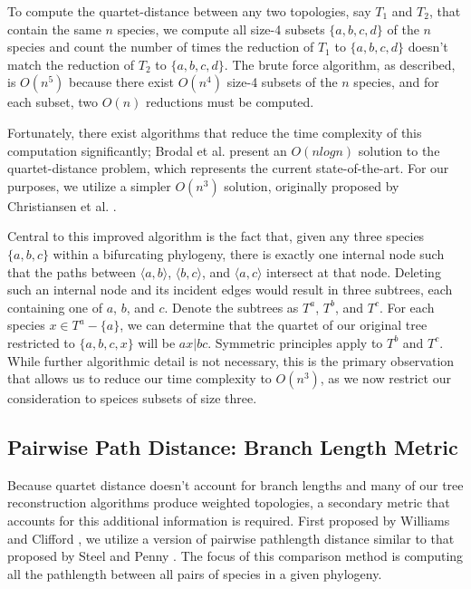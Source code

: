 \documentclass[10pt,twocolumn]{article}
\begin{document}
To compute the quartet-distance between any two topologies, say $T_1$ and $T_2$, that contain the same $n$ species, we compute all size-4 subsets $\{a,b,c,d\}$ of the $n$ species and count the number of times the reduction of $T_1$ to $\{a,b,c,d\}$ doesn't match the reduction of $T_2$ to $\{a,b,c,d\}$. The brute force algorithm, as described, is $O(n^5)$ because there exist $O(n^4)$ size-4 subsets of the $n$ species, and for each subset, two $O(n)$ reductions must be computed.

Fortunately, there exist algorithms that reduce the time complexity of this computation significantly; Brodal et al. \cite{brodal2004computing} present an $O(nlogn)$ solution to the quartet-distance problem, which represents the current state-of-the-art. For our purposes, we utilize a simpler $O(n^3)$ solution, originally proposed by Christiansen et al. \cite{christiansen2005computing}.

Central to this improved algorithm is the fact that, given any three species $\{a,b,c\}$ within a bifurcating phylogeny, there is exactly one internal node such that the paths between $\langle a, b \rangle$, $\langle b, c \rangle$, and $\langle a, c \rangle$ intersect at that node. Deleting such an internal node and its incident edges would result in three subtrees, each containing one of $a$, $b$, and $c$. Denote the subtrees as $T^a$, $T^b$, and $T^c$. For each species $x \in T^a - \{a\}$, we can determine that the quartet of our original tree restricted to $\{a,b,c,x\}$ will be $ax|bc$. Symmetric principles apply to $T^b$ and $T^c$. While further algorithmic detail is not necessary, this is the primary observation that allows us to reduce our time complexity to $O(n^3)$, as we now restrict our consideration to speices subsets of size three.

\subsection*{Pairwise Path Distance: Branch Length Metric}
Because quartet distance doesn't account for branch lengths and many of our tree reconstruction algorithms produce weighted topologies, a secondary metric that accounts for this additional information is required. First proposed by Williams and Clifford \cite{williams1971comparison}, we utilize a version of pairwise pathlength distance similar to that proposed by Steel and Penny \cite{steel1993distributions}. The focus of this comparison method is computing all the pathlength between all pairs of species in a given phylogeny.
\end{document}
